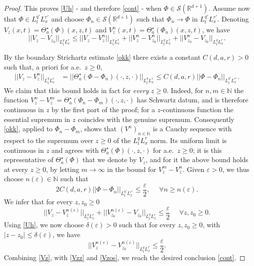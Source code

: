 \documentclass[11pt,letter]{amsart}
\def \N {\mathbb{N}}
\def \R {\mathbb{R}}
\numberwithin{equation}{section}
\newcommand{\ve}{\varepsilon}
\numberwithin{equation}{section}
\begin{document}
\begin{proof}
This proves \eqref{Uh} - and therefore \eqref{cont} -  when $\Phi\in \mathscr S(\R^{d+1})$. Assume now that $\Phi\in L^{q'}_tL^{r'}_x$ and choose $\Phi_n\in \mathscr S(\R^{d+1})$ such that
$\Phi_n\to \Phi$ in $L_t^{q'}L_x^{r'}$.
Denoting $V_z(x,t) = \Theta^\star_a(\Phi)(x,z,t)$ and $V^n_z(x,t) = \Theta^\star_a(\Phi_n)(x,z,t)$, we have
\begin{equation}\label{Vz}
||V_z - V_{z_0}||_{L^q_t L^r_x}\le ||V_z - V^n_z||_{L^q_t L^r_x} + ||V^n_z - V^n_{z_0}||_{L^q_t L^r_x} + ||V^n_{z_0} -  V_{z_0}||_{L^q_t L^r_x}.
\end{equation}


By the boundary Strichartz estimate \eqref{okk} there exists a constant $C(d,a,r)>0$ such that, a priori for a.e.\ $z\ge 0$,
\begin{align*}
||V_z - V_z^n||_{L^q_t L^r_x} & = ||\Theta^\star_a(\Phi - \Phi_n)(\cdot,z,\cdot)||_{L^q_t L^r_x} \le C(d,a,r) ||\Phi - \Phi_n||_{L^{q'}_t L^{r'}_x}.
\end{align*}
We claim that this bound holds in fact for \emph{every} $z\ge0$. Indeed, for $n, m\in \N$ the function $V^n_z - V^m_z = \Theta^\star_a(\Phi_n - \Phi_m)(\cdot,z,\cdot)$ has Schwartz datum, and is therefore continuous in $z$ by the first part of the proof; for a $z$-continuous function the essential supremum in $z$ coincides with the genuine supremum. Consequently \eqref{okk}, applied to $\Phi_n - \Phi_m$, shows that $(V^n)_{n\in\N}$ is a Cauchy sequence with respect to the supremum over $z\ge0$ of the $L^q_tL^r_x$ norm. Its uniform limit is continuous in $z$ and agrees with $\Theta^\star_a(\Phi)(\cdot,z,\cdot)$ for a.e.\ $z\ge0$; it is this representative of $\Theta^\star_a(\Phi)$ that we denote by $V_z$, and for it the above bound holds at every $z\ge0$, by letting $m\to\infty$ in the bound for $V^m_z - V^n_z$.
Given $\ve>0$, we thus choose $n(\ve)\in \mathbb N$ such that
\[
2 C(d,a,r) ||\Phi - \Phi_n||_{L^{q'}_t L^{r'}_x} \le \frac{\ve}2,\ \ \ \ \ \ \forall n\ge n(\ve).
\]
We infer that for every $z, z_0\ge 0$ 
\begin{equation}\label{Vzz}
||V_z - V_z^{n(\ve)}||_{L^q_t L^r_x} + ||V^{n(\ve)}_{z_0} -  V_{z_0}||_{L^q_t L^r_x} \le \frac{\ve}2\ \ \ \ \ \ \forall z, z_0 \ge 0.
\end{equation}
Using \eqref{Uh}, we now choose $\delta(\ve)>0$ such that for every $z, z_0\ge 0$, with $|z-z_0|\le \delta(\ve)$, we have
\begin{equation}\label{Vzos}
||V^{n(\ve)}_z - V^{n(\ve)}_{z_0}||_{L^q_t L^r_x} \le \frac{\ve}2.
\end{equation}
Combining \eqref{Vz}, with \eqref{Vzz} and \eqref{Vzos}, we reach the desired conclusion \eqref{cont}.




\end{proof}
\end{document}
